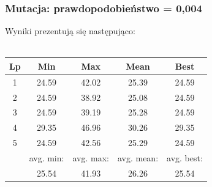 \documentclass[a4paper,11pt]{article}
\begin{document}
				\subsubsection{Mutacja: prawdopodobieństwo = 0,004}
					Wyniki prezentują się następująco:\\~\\
					\begin{tabular}{|c|c|c|c|c|}
						\hline 
						Lp & Min & Max & Mean & Best \\
						\hline
						1 & 24.59 & 42.02 & 25.39 & 24.59 \\\hline
						2 & 24.59 & 38.92 & 25.08 & 24.59 \\\hline
						3 & 24.59 & 39.19 & 25.28 & 24.59 \\\hline
						4 & 29.35 & 46.96 & 30.26 & 29.35 \\\hline
						5 & 24.59 & 42.56 & 25.29 & 24.59 \\\hline
						&avg. min:&avg. max:&avg. mean:&avg. best:\\\hline
						& 25.54 & 41.93 & 26.26 & 25.54 \\\hline
						
					\end{tabular} 
\end{document}
